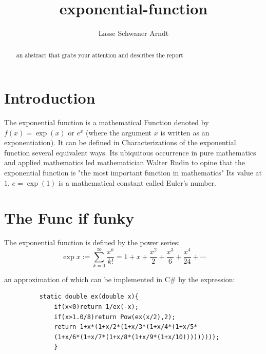 \documentclass[twocolumn,a4paper]{article}
\begin{document}
\title{exponential-function}
\author{Lasse Schwaner Arndt}
\maketitle
\begin{abstract}
	an abstract that grabs your attention and describes the report
\end{abstract}

\section{Introduction}
The exponential function is a mathematical Function 
denoted by $f(x)=\exp(x)$ or $e^x$ (where the argument $x$ 
is written as an exponentiation). It can be defined in 
Characterizations of the exponential function several equivalent ways. 
Its ubiquitous occurrence in pure mathematics and applied mathematics 
led mathematician Walter Rudin to opine that the exponential function is 
"the most important function in mathematics"
Its value at $1$, $e = \exp(1)$ is a mathematical constant
called Euler's number. \\

\section{The Func if funky}
The exponential function is defined by the power series:
\begin{equation}\label{eq-pwr}
	\exp x := \sum_{k = 0}^{\infty} \frac{x^k}{k!} = 1 + x + \frac{x^2}{2} + \frac{x^3}{6} + \frac{x^4}{24} + \cdots
\end{equation}

an approximation of which can be implemented in C\# by the expression:
\begin{figure}[ht!]
	\begin{verbatim}
	static double ex(double x){
		if(x<0)return 1/ex(-x);
		if(x>1.0/8)return Pow(ex(x/2),2); 
		return 1+x*(1+x/2*(1+x/3*(1+x/4*(1+x/5*
		(1+x/6*(1+x/7*(1+x/8*(1+x/9*(1+x/10)))))))));
		}
	\end{verbatim}
\end{figure}
\end{document}
